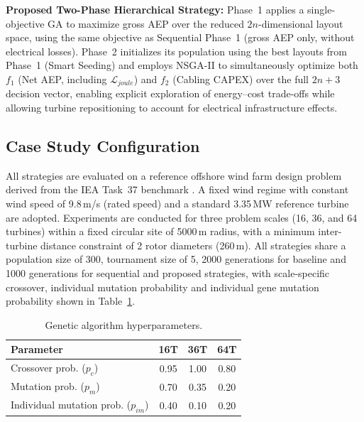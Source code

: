 \documentclass[format=sigconf,anonymous=true,review=true]{acmart}
\begin{document}
\textbf{Proposed Two-Phase Hierarchical Strategy:} Phase~1 applies a single-objective GA to maximize gross AEP over the reduced $2n$-dimensional layout space, using the same objective as Sequential Phase~1 (gross AEP only, without electrical losses). Phase~2 initializes its population using the best layouts from Phase~1 (Smart Seeding) and employs NSGA-II \cite{Deb2002NSGA2} to simultaneously optimize both $f_1$ (Net AEP, including $\mathcal{L}_{joule}$) and $f_2$ (Cabling CAPEX) over the full $2n+3$ decision vector, enabling explicit exploration of energy--cost trade-offs while allowing turbine repositioning to account for electrical infrastructure effects.

\subsection{Case Study Configuration}

All strategies are evaluated on a reference offshore wind farm design problem derived from the IEA Task~37 benchmark \cite{Silva2025Layout, Baker2019Best}. A fixed wind regime with constant wind speed of 9.8\,m/s (rated speed) and a standard 3.35\,MW reference turbine are adopted. Experiments are conducted for three problem scales (16, 36, and 64 turbines) within a fixed circular site of 5000\,m radius, with a minimum inter-turbine distance constraint of 2 rotor diameters (260\,m). All strategies share a population size of 300, tournament size of 5, 2000 generations for baseline and 1000 generations for sequential and proposed strategies, with scale-specific crossover, individual mutation probability and individual gene mutation probability shown in Table~\ref{tab:ga_params}.

\begin{table}[htbp]
\caption{Genetic algorithm hyperparameters.}
\label{tab:ga_params}
\centering
\small
\begin{tabular}{lccc}
\toprule
\textbf{Parameter} & \textbf{16T} & \textbf{36T} & \textbf{64T} \\
\midrule
Crossover prob. ($p_c$) & 0.95 & 1.00 & 0.80 \\
Mutation prob. ($p_m$) & 0.70 & 0.35 & 0.20 \\
Individual mutation prob. ($p_{im}$) & 0.40 & 0.10 & 0.20 \\
\bottomrule
\end{tabular}
\end{table}
\end{document}
